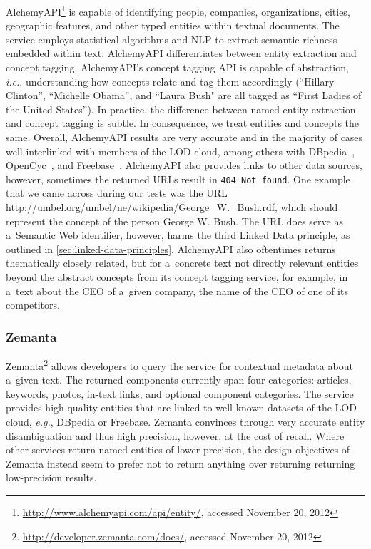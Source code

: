 AlchemyAPI\footnote{\url{http://www.alchemyapi.com/api/entity/},
accessed November 20, 2012}
is capable of identifying people, companies, organizations,
cities, geographic features, and other typed entities within
textual documents.
The service employs statistical algorithms and NLP
to extract semantic richness embedded within text.
AlchemyAPI differentiates between entity extraction and
concept tagging.
AlchemyAPI's concept tagging API is capable of abstraction, \emph{i.e.},
understanding how concepts relate and tag them accordingly
(``Hillary Clinton'', ``Michelle Obama'', and ``Laura Bush" are all
tagged as ``First Ladies of the United States'').
In practice, the difference between named entity extraction
and concept tagging is subtle.
In consequence, we treat entities and concepts the same.
Overall, AlchemyAPI results are very accurate
and in the majority of cases well interlinked
with members of the LOD cloud,
among others with DBpedia~\cite{auer2007dbpedia},
OpenCyc~\cite{lenat1995cyc},
and Freebase~\cite{markoff2007freebase}.
AlchemyAPI also provides links to other data sources, however,
sometimes the returned URLs result in \texttt{404 Not found}.
One example that we came across during our tests was the URL
\url{http://umbel.org/umbel/ne/wikipedia/George\_W.\_Bush.rdf}, which should represent the concept of the person George W. Bush.
The URL does serve as a~Semantic Web identifier, however, 
harms the third Linked Data principle,
as outlined in \autoref{sec:linked-data-principles}.
AlchemyAPI also oftentimes returns thematically closely related,
but for a~concrete text not directly relevant entities
beyond the abstract concepts from its concept tagging service,
for example, in a~text about the CEO of a~given company,
the name of the CEO of one of its competitors.

\subsubsection{Zemanta}

Zemanta\footnote{\url{http://developer.zemanta.com/docs/},
accessed November 20, 2012}
allows developers to query the service for contextual metadata
about a~given text.
The returned components currently span four categories:
articles, keywords, photos, in-text links, and
optional component categories.
The service provides high quality entities that are linked
to well-known datasets of the LOD cloud, \emph{e.g.},
DBpedia or Freebase.
Zemanta convinces through very accurate entity disambiguation
and thus high precision, however, at the cost of recall.
Where other services return named entities of lower precision,
the design objectives of Zemanta instead seem to prefer
not to return anything over returning returning low-precision results.

